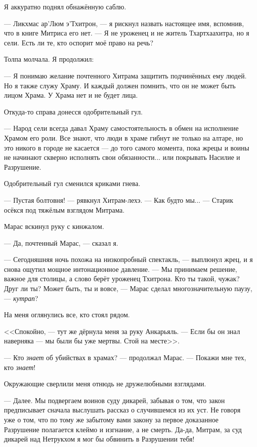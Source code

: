 Я аккуратно поднял обнажённую саблю.

--- Ликхмас ар’Люм э’Тхитрон, --- я рискнул назвать настоящее имя, вспомнив, что в книге Митриса его нет.
--- Я не уроженец и не житель Тхартхаахитра, но я сели.
Есть ли те, кто оспорит моё право на речь?

Толпа молчала.
Я продолжил:

--- Я понимаю желание почтенного Хитрама защитить подчинённых ему людей.
Но я также служу Храму. И каждый должен помнить, что он не может быть лицом Храма.
У Храма нет и не будет лица.

Откуда-то справа донесся одобрительный гул.

--- Народ сели всегда давал Храму самостоятельность в обмен на исполнение Храмом его роли.
Все знают, что люди в храме гибнут не только на алтаре, но это никого в городе не касается --- до того самого момента, пока жрецы и воины не начинают скверно исполнять свои обязанности... или покрывать Насилие и Разрушение.

Одобрительный гул сменился криками гнева.

--- Пустая болтовня! --- рявкнул Хитрам-лехэ.
--- Как будто мы... --- Старик осёкся под тяжёлым взглядом Митрама.

Марас вскинул руку с кинжалом.

--- Да, почтенный Марас, --- сказал я.

--- Сегодняшняя ночь похожа на низкопробный спектакль, --- выплюнул жрец, и я снова ощутил мощное интонационное давление.
--- Мы принимаем решение, важное для столицы, а слово берёт уроженец Тхитрона.
Кто ты такой, чужак?
Друг ли ты?
Может быть, ты и вовсе, --- Марас сделал многозначительную паузу, --- \emph{кутрап}?

На меня оглянулись все, кто стоял рядом.

<<Спокойно, --- тут же дёрнула меня за руку Анкарьяль.
--- Если бы он знал наверняка --- мы были бы уже мертвы.
Стой на месте>>.

--- Кто \emph{знает} об убийствах в храмах? --- продолжал Марас.
--- Покажи мне тех, кто \emph{знает}!

Окружающие сверлили меня отнюдь не дружелюбными взглядами.

--- Далее.
Мы подвергаем воинов суду дикарей\FM, забывая о том, что закон предписывает сначала выслушать рассказ о случившемся из их уст.
Не говоря уже о том, что по тому же забытому вами закону за первое доказанное Разрушение полагается клеймо и изгнание, а не смерть.
Да-да, Митрам, за суд дикарей над Нетрукхом я мог бы обвинить в Разрушении тебя!

